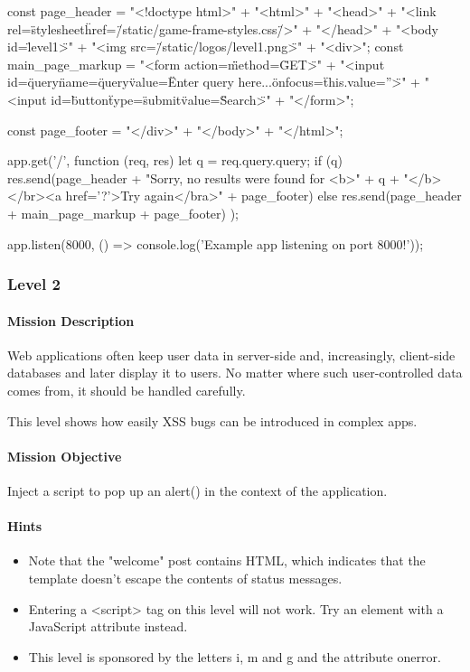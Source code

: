 \begin{Exercise}[label={websec-xss-game}]
\begin{js}
const page_header = "<!doctype html>" +
  "<html>" +
  "<head>" +
  "<link rel=\"stylesheet\" href=\"/static/game-frame-styles.css\" />" +
  "</head>" +
  "<body id=\"level1\">" +
  "<img src=\"/static/logos/level1.png\">" +
  "<div>";
const main_page_markup =
  "<form action=\"\" method=\"GET\">" +
  "<input id=\"query\" name=\"query\" value=\"Enter query here...\" onfocus=\"this.value=''\">" +
  "<input id=\"button\" type=\"submit\" value=\"Search\">" +
  "</form>";

const page_footer =
  "</div>" +
  "</body>" +
  "</html>";

app.get('/', function (req, res) {
  let q = req.query.query;
  if (q) {
    res.send(page_header +
    "Sorry, no results were found for <b>" + q + "</b></br><a href='?'>Try again</bra>" +
    page_footer)
  } else {
    res.send(page_header + main_page_markup + page_footer)
  }
});

app.listen(8000, () => console.log('Example app listening on port 8000!'));
\end{js}

	\subsubsection{Level 2}
\paragraph{Mission Description}
Web applications often keep user data in server-side and, increasingly, client-side databases and later display it to users. No matter where such user-controlled data comes from, it should be handled carefully. 

This level shows how easily XSS bugs can be introduced in complex apps.
\paragraph{Mission Objective}
Inject a script to pop up an alert() in the context of the application. 

\paragraph{Hints}
\begin{itemize}
\item Note that the "welcome" post contains HTML, which indicates that the template doesn't escape the contents of status messages.
\item Entering a <script> tag on this level will not work. Try an element with a JavaScript attribute instead.
\item This level is sponsored by the letters i, m and g and the attribute onerror.
\end{itemize}



\end{Exercise}

